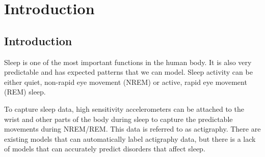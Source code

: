 
\chapter{Introduction} %

\label{Chapter1} %


\newcommand{\keyword}[1]{\textbf{#1}}
\newcommand{\tabhead}[1]{\textbf{#1}}
\newcommand{\code}[1]{\texttt{#1}}
\newcommand{\file}[1]{\texttt{\bfseries#1}}
\newcommand{\option}[1]{\texttt{\itshape#1}}


\section{Introduction}
Sleep is one of the most important functions in the human body. It is also very predictable and has expected patterns that we can model. Sleep activity can be either quiet, non-rapid eye movement (NREM) or active, rapid eye movement (REM) sleep.

To capture sleep data, high sensitivity accelerometers can be attached to the wrist and other parts of the body during sleep to capture the predictable movements during NREM/REM. This data is referred to as actigraphy. There are existing models that can automatically label actigraphy data, but there is a lack of models that can accurately predict disorders that affect sleep. 



